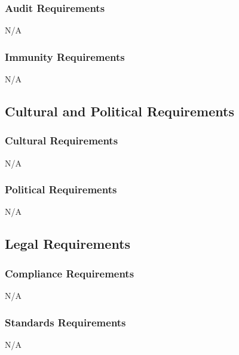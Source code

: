 \documentclass[]{article}
\begin{document}
\subsubsection{Audit Requirements}
\label{ssub:audit_requirements}
N/A

\subsubsection{Immunity Requirements}
\label{ssub:immunity_requirements}
N/A

\subsection{Cultural and Political Requirements}
\label{sub:cultural_and_political_requirements}

\subsubsection{Cultural Requirements}
\label{ssub:cultural_requirements}
N/A

\subsubsection{Political Requirements}
\label{ssub:political_requirements}
N/A

\subsection{Legal Requirements}
\label{sub:legal_requirements}

\subsubsection{Compliance Requirements}
\label{ssub:compliance_requirements}
N/A

\subsubsection{Standards Requirements}
\label{ssub:standards_requirements}
N/A

\newpage
\appendix
\end{document}
